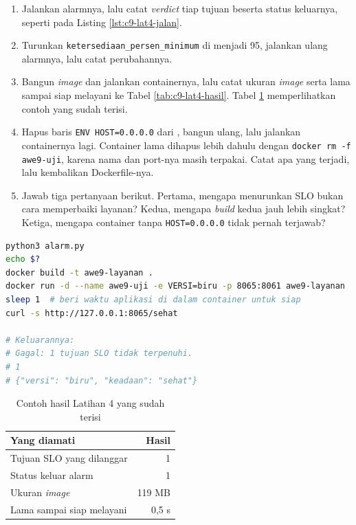 \begin{enumerate}
  \item Jalankan alarmnya, lalu catat \textit{verdict} tiap tujuan beserta
        status keluarnya, seperti pada Listing \ref{lst:c9-lat4-jalan}.
  \item Turunkan \texttt{ketersediaan\_persen\_minimum} di
         menjadi 95, jalankan ulang
        alarmnya, lalu catat perubahannya.
  \item Bangun \textit{image} dan jalankan containernya, lalu catat ukuran
        \textit{image} serta lama sampai siap melayani ke Tabel \ref{tab:c9-lat4-hasil}. Tabel \ref{tab:c9-lat4-contoh}
        memperlihatkan contoh yang sudah terisi.
  \item Hapus baris \texttt{ENV HOST=0.0.0.0} dari
        , bangun ulang, lalu jalankan
        containernya lagi. Container lama dihapus lebih dahulu dengan
        \texttt{docker rm -f awe9-uji}, karena nama dan port-nya masih
        terpakai. Catat apa yang terjadi, lalu kembalikan Dockerfile-nya.
  \item Jawab tiga pertanyaan berikut. Pertama, mengapa menurunkan SLO bukan
        cara memperbaiki layanan? Kedua, mengapa \textit{build} kedua jauh
        lebih singkat? Ketiga, mengapa container tanpa
        \texttt{HOST=0.0.0.0} tidak pernah terjawab?
\end{enumerate}

\begin{lstlisting}[language=bash, caption={Menjalankan alarm lalu membangun container, tersedia di \berkas{sources/chapter09/alarm.py}}, label={lst:c9-lat4-jalan}]
python3 alarm.py
echo $?
docker build -t awe9-layanan .
docker run -d --name awe9-uji -e VERSI=biru -p 8065:8061 awe9-layanan
sleep 1  # beri waktu aplikasi di dalam container untuk siap
curl -s http://127.0.0.1:8065/sehat

# Keluarannya:
# Gagal: 1 tujuan SLO tidak terpenuhi.
# 1
# {"versi": "biru", "keadaan": "sehat"}
\end{lstlisting}

\begin{table}[!htb]
  \centering
  \caption{Contoh hasil Latihan 4 yang sudah terisi}
  \label{tab:c9-lat4-contoh}
  \begin{tabularx}{\textwidth}{Xr}
    \hline
    \textbf{Yang diamati} & \textbf{Hasil} \\
    \hline
    Tujuan SLO yang dilanggar & 1 \\
    \hline
    Status keluar alarm & 1 \\
    \hline
    Ukuran \textit{image} & 119 MB \\
    \hline
    Lama sampai siap melayani & 0,5 s \\
    \hline
  \end{tabularx}
\end{table}

